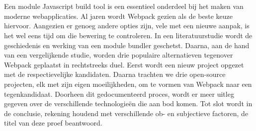 

\chapter*{}
Een module Javascript build tool is een essentieel onderdeel bij het maken van moderne webapplicaties. Al jaren wordt Webpack gezien als de beste keuze hiervoor. Aangezien er genoeg andere opties zijn, vele met een nieuwe aanpak, is het wel eens tijd om die bewering te controleren. In een literatuurstudie wordt de geschiedenis en werking van een module bundler geschetst. Daarna, aan de hand van een vergelijkende studie, worden drie populaire alternatieven tegenover Webpack geplaatst in rechtstreeks duel. Eerst wordt een nieuw project opgezet met de respectievelijke kandidaten. Daarna trachten we drie open-source projecten, elk met zijn eigen moeilijkheden, om te vormen van Webpack naar een tegenkandidaat. Doorheen dit gedocumenteerd proces, wordt er meer uitleg gegeven over de verschillende technologieën die aan bod komen. Tot slot wordt in de conclusie, rekening houdend met verschillende ob- en subjectieve factoren, de titel van deze proef beantwoord.


